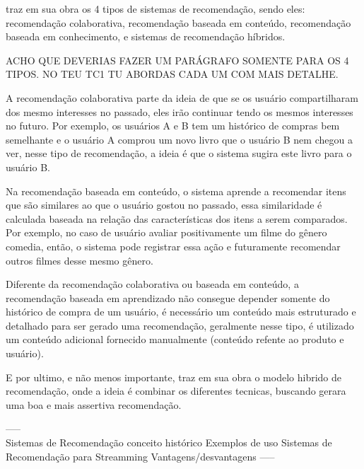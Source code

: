 \documentclass{article}
\begin{document}
\cite{jannach2010recommender} traz em sua obra os 4 tipos de sistemas de recomendação, sendo eles: recomendação colaborativa, recomendação baseada em conteúdo, recomendação baseada em conhecimento, e sistemas de recomendação híbridos.

{\color{red} ACHO QUE DEVERIAS FAZER UM PARÁGRAFO SOMENTE PARA OS 4 TIPOS. NO TEU TC1 TU ABORDAS CADA UM COM MAIS DETALHE.}

A recomendação colaborativa parte da ideia de que se os usuário compartilharam dos mesmo interesses no passado, eles irão continuar tendo os mesmos interesses no futuro. Por exemplo, os usuários A e B tem um histórico de compras bem semelhante e o usuário A comprou um novo livro que o usuário B nem chegou a ver, nesse tipo de recomendação, a ideia é que o sistema sugira este livro para o usuário B. \cite{jannach2010recommender}

Na recomendação baseada em conteúdo, o sistema aprende a recomendar itens que são similares ao que o usuário gostou no passado, essa similaridade é calculada baseada na relação das características dos itens a serem comparados. Por exemplo, no caso de usuário avaliar positivamente um filme do gênero comedia, então, o sistema pode registrar essa ação e futuramente recomendar outros filmes desse mesmo gênero. \cite{ricci2011introduction}

Diferente da recomendação colaborativa ou baseada em conteúdo, a recomendação baseada em aprendizado não consegue depender somente do histórico de compra de um usuário, é necessário um conteúdo mais estruturado e detalhado para ser gerado uma recomendação, geralmente nesse tipo, é utilizado um conteúdo adicional fornecido manualmente (conteúdo refente ao produto e usuário). \cite{jannach2010recommender}

E por ultimo, e não menos importante, \cite{jannach2010recommender} traz em sua obra o modelo hibrido de recomendação, onde a ideia é combinar os diferentes tecnicas, buscando gerara uma boa e mais assertiva recomendação. \cite{jannach2010recommender}

----- \\

Sistemas de Recomendação
   conceito
   histórico
   Exemplos de uso
   Sistemas de Recomendação para Streamming
   Vantagens/desvantagens
----- \\

\end{document}
